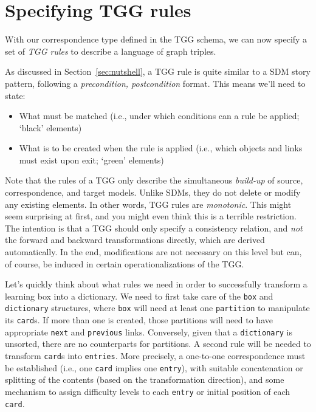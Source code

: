 \newpage
\hypertarget{sec:Rules}{}
\section{Specifying TGG rules}
\genHeader

With our correspondence type defined in the TGG schema, we can now specify a set of \emph{TGG rules} to describe a language of graph
triples.

As discussed in Section~\ref{sec:nutshell}, a TGG rule is quite similar to a SDM story pattern, following a \emph{precondition, postcondition}
format. This means we'll need to state:

\begin{itemize}

\item What must be matched (i.e., under which conditions can a rule be applied; `black' elements)

\item What is to be created when the rule is applied (i.e., which objects and links must exist upon exit; `green' elements)

\end{itemize}

\vspace{0.5cm}

Note that the rules of a TGG only describe the simultaneous \emph{build-up} of source, correspondence, and target models.
Unlike SDMs, they do not delete or modify any existing elements. 
In other words, TGG rules are \emph{monotonic}.
This might seem surprising at first, and you might even think
this is a terrible restriction. 
The intention is that a TGG should only specify a consistency relation, and \emph{not} the forward and backward transformations
directly, which are derived automatically. 
In the end, modifications are not necessary on this level but can, of course, be induced in certain
operationalizations of the TGG.

Let's quickly think about what rules we need in order to successfully transform a learning box into a dictionary. 
We need to first take care of the \texttt{box}
and \texttt{dictionary} structures, where \texttt{box} will need at least one \texttt{partition} to manipulate its \texttt{card}s. If more than one is created, those partitions will need to have appropriate \texttt{next} and \texttt{previous} links. 
Conversely, given that a \texttt{dictionary} is unsorted, there are no
counterparts for partitions. 
A second rule will be needed to transform \texttt{card}s into \texttt{entries}.
More precisely, a one-to-one correspondence must be
established (i.e., one \texttt{card} implies one \texttt{entry}), with suitable
concatenation or splitting of the contents (based on the transformation direction), and some mechanism to assign difficulty levels to each \texttt{entry} or initial position of each \texttt{card}.




